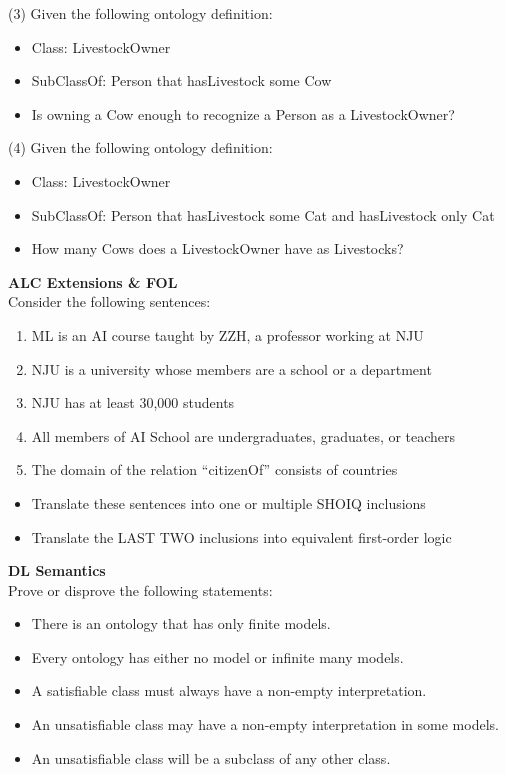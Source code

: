 \documentclass[12pt,a4paper]{article}
\newenvironment{problem}[2][{\color{red}Question}]{\begin{trivlist}
\item[\hskip \labelsep {\bfseries #1}\hskip \labelsep {\bfseries #2.}]}{\end{trivlist}}
\begin{document}
\begin{problem}{{\color{red}1}}
(3) Given the following ontology definition:
\begin{itemize}
\item[] Class: LivestockOwner
\item[] \quad SubClassOf: Person that hasLivestock some Cow
\item Is owning a Cow enough to recognize a Person as a LivestockOwner?
\end{itemize}


(4) Given the following ontology definition:
\begin{itemize}
\item[] Class: LivestockOwner
\item[] \quad SubClassOf: Person that hasLivestock some Cat and hasLivestock only Cat
\item How many Cows does a LivestockOwner have as Livestocks?
\end{itemize}
\end{problem}



\begin{problem}{{\color{red}2}}
\textbf{ALC Extensions \& FOL}\\
Consider the following sentences:
\begin{enumerate}
    \item[(1)] ML is an AI course taught by ZZH, a professor working at NJU
    \item[(2)] NJU is a university whose members are a school or a department
    \item[(3)] NJU has at least 30,000 students
    \item[(4)] All members of AI School are undergraduates, graduates, or teachers
    \item[(5)] The domain of the relation ``citizenOf'' consists of countries
\end{enumerate}
\begin{itemize}
    \item Translate these sentences into one or multiple SHOIQ inclusions
    \item Translate the LAST TWO inclusions into equivalent first-order logic
\end{itemize}

\end{problem}

\begin{problem}{{\color{red}3}}
\textbf{DL Semantics}\\
Prove or disprove the following statements:
\begin{itemize}
    \item There is an ontology that has only finite models.
    \item Every ontology has either no model or infinite many models.
    \item A satisfiable class must always have a non-empty interpretation.
    \item An unsatisfiable class may have a non-empty interpretation in some models.
    \item An unsatisfiable class will be a subclass of any other class.
\end{itemize}
\end{problem}
\end{document}
